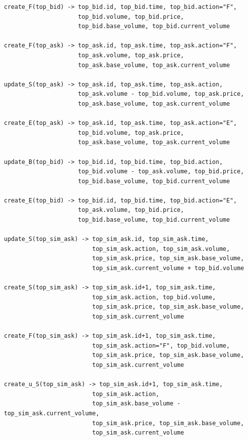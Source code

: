 \documentclass{article}
\begin{document}
\begin{verbatim}
create_F(top_bid) -> top_bid.id, top_bid.time, top_bid.action="F",
                     top_bid.volume, top_bid.price,
                     top_bid.base_volume, top_bid.current_volume
                     
create_F(top_ask) -> top_ask.id, top_ask.time, top_ask.action="F",
                     top_ask.volume, top_ask.price,
                     top_ask.base_volume, top_ask.current_volume
                     
update_S(top_ask) -> top_ask.id, top_ask.time, top_ask.action,
                     top_ask.volume - top_bid.volume, top_ask.price,
                     top_ask.base_volume, top_ask.current_volume
                     
create_E(top_ask) -> top_ask.id, top_ask.time, top_ask.action="E",
                     top_bid.volume, top_ask.price,
                     top_ask.base_volume, top_ask.current_volume
                     
update_B(top_bid) -> top_bid.id, top_bid.time, top_bid.action,
                     top_bid.volume - top_ask.volume, top_bid.price,
                     top_bid.base_volume, top_bid.current_volume
                     
create_E(top_bid) -> top_bid.id, top_bid.time, top_bid.action="E",
                     top_ask.volume, top_bid.price,
                     top_bid.base_volume, top_bid.current_volume
                     
update_S(top_sim_ask) -> top_sim_ask.id, top_sim_ask.time,
                         top_sim_ask.action, top_sim_ask.volume, 
                         top_sim_ask.price, top_sim_ask.base_volume, 
                         top_sim_ask.current_volume + top_bid.volume
                         
create_S(top_sim_ask) -> top_sim_ask.id+1, top_sim_ask.time,
                         top_sim_ask.action, top_bid.volume, 
                         top_sim_ask.price, top_sim_ask.base_volume, 
                         top_sim_ask.current_volume
                         
create_F(top_sim_ask) -> top_sim_ask.id+1, top_sim_ask.time,
                         top_sim_ask.action="F", top_bid.volume, 
                         top_sim_ask.price, top_sim_ask.base_volume, 
                         top_sim_ask.current_volume

create_u_S(top_sim_ask) -> top_sim_ask.id+1, top_sim_ask.time,
                         top_sim_ask.action, 
                         top_sim_ask.base_volume - top_sim_ask.current_volume, 
                         top_sim_ask.price, top_sim_ask.base_volume, 
                         top_sim_ask.current_volume


\end{verbatim}
\end{document}
